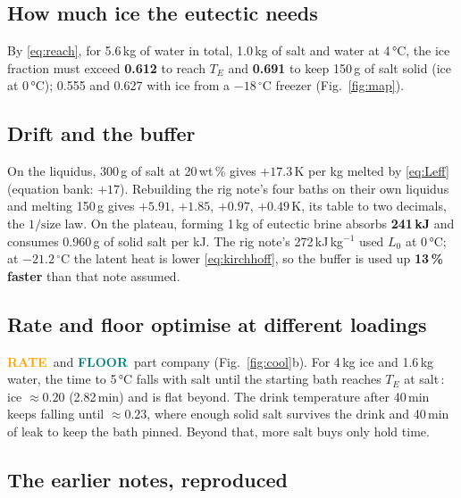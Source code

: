 \documentclass[11pt,a4paper]{article}
\newcommand{\dC}{\,^{\circ}\mathrm{C}}
\newcommand{\FLOOR}{\textcolor{teal}{\textsf{\bfseries FLOOR}}}
\newcommand{\RATE}{\textcolor{orange}{\textsf{\bfseries RATE}}}
\begin{document}
\subsection{How much ice the eutectic needs}
By \eqref{eq:reach}, for 5.6\,kg of water in total, 1.0\,kg of salt and water at 4\,°C, the ice fraction
must exceed \textbf{0.612} to reach $T_E$ and \textbf{0.691} to keep 150\,g of salt solid (ice at 0\,°C);
0.555 and 0.627 with ice from a $-18\dC$ freezer (Fig.~\ref{fig:map}).

\subsection{Drift and the buffer}
On the liquidus, 300\,g of salt at 20\,wt\,\% gives $+17.3$\,K per kg melted by \eqref{eq:Leff}
(equation bank: $+17$). Rebuilding the rig note's four baths on their own liquidus and melting 150\,g
gives $+5.91$, $+1.85$, $+0.97$, $+0.49$\,K, its table to two decimals, the $1/\text{size}$ law. On the
plateau, forming 1\,kg of eutectic brine absorbs \textbf{241\,kJ} and consumes 0.960\,g of solid salt per
kJ. The rig note's 272\,kJ\,kg$^{-1}$ used $L_0$ at 0\,°C; at $-21.2\dC$ the latent heat is lower
\eqref{eq:kirchhoff}, so the buffer is used up \textbf{13\,\% faster} than that note assumed.

\subsection{Rate and floor optimise at different loadings}
\RATE\ and \FLOOR\ part company (Fig.~\ref{fig:cool}b). For 4\,kg ice and 1.6\,kg water, the time to
5\,°C falls with salt until the starting bath reaches $T_E$ at salt\,:\,ice $\approx 0.20$
(2.82\,min) and is flat beyond. The drink temperature after 40\,min keeps falling until
$\approx 0.23$, where enough solid salt survives the drink and 40\,min of leak to keep the bath
pinned. Beyond that, more salt buys only hold time.

\subsection{The earlier notes, reproduced}
\end{document}
